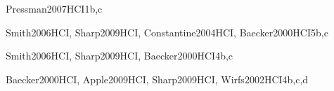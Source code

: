 \begin{syllabus}
\begin{unit}{\PLObjectOrientedProgrammingDef}{}{Pressman2007HCI}{1}{b,c}
    \begin{topics}%
	 \item \PLObjectOrientedProgrammingTopicObject
	 \item \PLObjectOrientedProgrammingTopicUML
	 \item \PLObjectOrientedProgrammingTopicClasses
	 \item \PLObjectOrientedProgrammingTopicInheritance
	 \item \PLObjectOrientedProgrammingTopicClasshierarchies
	 \item \PLObjectOrientedProgrammingTopicCollection
    \end{topics}%
    \begin{learningoutcomes}%
	 \item \PLObjectOrientedProgrammingObjONE
	 \item \PLObjectOrientedProgrammingObjTWO
	 \item \PLObjectOrientedProgrammingObjFOUR
	 \item \PLObjectOrientedProgrammingObjSEVEN
    \end{learningoutcomes}%
\end{unit}


\begin{unit}{\HCUserCenteredSoftwareDevelopmentDef}{}{Smith2006HCI, Sharp2009HCI, Constantine2004HCI, Baecker2000HCI}{5}{b,c}
    \HCUserCenteredSoftwareDevelopmentAllTopics
    \HCUserCenteredSoftwareDevelopmentAllObjectives
\end{unit}

\begin{unit}{\HCUserCenteredSoftwareEvaluationDef}{}{Smith2006HCI, Sharp2009HCI, Baecker2000HCI}{4}{b,c}
    \HCUserCenteredSoftwareEvaluationAllTopics
    \HCUserCenteredSoftwareEvaluationAllObjectives
\end{unit}

\begin{unit}{\HCGUIDesignDef}{}{Baecker2000HCI, Apple2009HCI, Sharp2009HCI, Wirfs2002HCI}{4}{b,c,d}
    \HCGUIDesignAllTopics
    \HCGUIDesignAllObjectives
\end{unit}


\end{syllabus}
